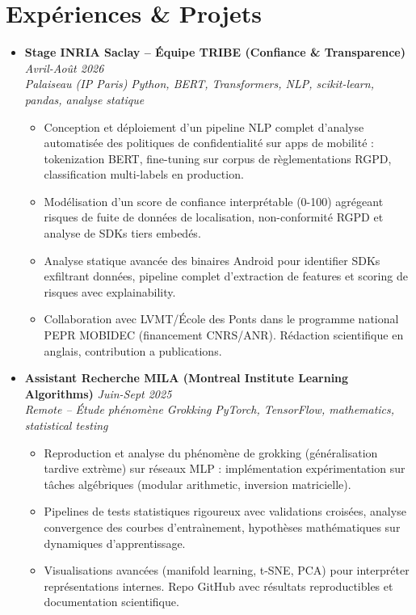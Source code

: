 \documentclass[a4paper,11pt]{article}
\begin{document}
\section{Exp\'eriences \& Projets}
\begin{itemize}[leftmargin=*, label={-}]

\item \textbf{Stage INRIA Saclay -- \'Equipe TRIBE (Confiance \& Transparence)} \hfill \textit{Avril-Ao\^ut 2026} \\
\textit{Palaiseau (IP Paris)} \hfill \textit{Python, BERT, Transformers, NLP, scikit-learn, pandas, analyse statique}
\vspace{-2pt}
    \begin{itemize}[leftmargin=0.4cm, nosep, label=\tiny$\bullet$]
        \item \small{Conception et d\'eploiement d'un pipeline NLP complet d'analyse automatisée des politiques de confidentialit\'e sur apps de mobilit\'e : tokenization BERT, fine-tuning sur corpus de r\`eglementations RGPD, classification multi-labels en production.}
        \item \small{Mod\'elisation d'un score de confiance interpr\'etable (0-100) agr\'egeant risques de fuite de donn\'ees de localisation, non-conformit\'e RGPD et analyse de SDKs tiers embed\'es.}
        \item \small{Analyse statique avanc\'ee des binaires Android pour identifier SDKs exfiltrant donn\'ees, pipeline complet d'extraction de features et scoring de risques avec explainability.}
        \item \small{Collaboration avec LVMT/\'Ecole des Ponts dans le programme national PEPR MOBIDEC (financement CNRS/ANR). R\'edaction scientifique en anglais, contribution a publications.}
    \end{itemize}
\vspace{3pt}

\item \textbf{Assistant Recherche MILA (Montreal Institute Learning Algorithms)} \hfill \textit{Juin-Sept 2025} \\
\textit{Remote -- \'Etude ph\'enom\`ene Grokking} \hfill \textit{PyTorch, TensorFlow, mathematics, statistical testing}
\vspace{-2pt}
    \begin{itemize}[leftmargin=0.4cm, nosep, label=\tiny$\bullet$]
        \item \small{Reproduction et analyse du ph\'enom\`ene de grokking (g\'en\'eralisation tardive extr\`eme) sur r\'eseaux MLP : impl\'ementation exp\'erimentation sur t\^aches alg\'ebriques (modular arithmetic, inversion matricielle).}
        \item \small{Pipelines de tests statistiques rigoureux avec validations crois\'ees, analyse convergence des courbes d'entra\`inement, hypoth\`eses math\'ematiques sur dynamiques d'apprentissage.}
        \item \small{Visualisations avanc\'ees (manifold learning, t-SNE, PCA) pour interpr\'eter repr\'esentations internes. Repo GitHub avec r\'esultats reproductibles et documentation scientifique.}
    \end{itemize}
\vspace{3pt}


\end{itemize}
\end{document}
